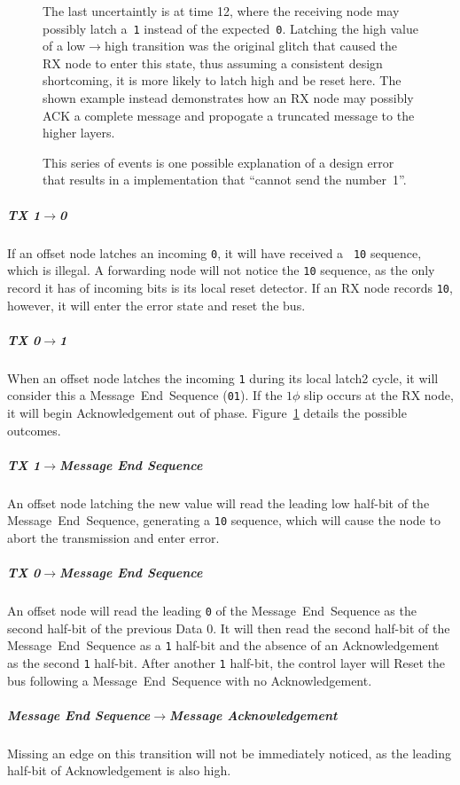 \begin{figure}[htb]
{    \hspace{1em}
    The last uncertaintly is at time 12, where the receiving node may possibly
    latch a~{\tt 1} instead of the expected~{\tt 0}. Latching the high value
    of a low$\rightarrow$high transition was the original glitch that caused
    the RX node to enter this state, thus assuming a consistent design
    shortcoming, it is more likely to latch high and be reset here. The shown
    example instead demonstrates how an RX node may possibly ACK a complete
    message and propogate a truncated message to the higher layers.

    \hspace{1em}
    This series of events is one possible explanation of a design error that
    results in a \bus implementation that ``cannot send the number~1''.
  }
  \label{fig:1phi-1-0}
\end{figure}

\subparagraph{TX 1$\rightarrow$0}
If an offset node latches an incoming {\tt 0}, it will have received a {\tt
10} sequence, which is illegal. A forwarding node will not notice the {\tt 10}
sequence, as the only record it has of incoming bits is its local reset
detector. If an RX node records {\tt 10}, however, it will enter the {\sc
error} state and reset the bus.

\subparagraph{TX 0$\rightarrow$1}
When an offset node latches the incoming {\tt 1} during its local {\sc latch2}
cycle, it will consider this a Message~End~Sequence ({\tt 01}). If the $1\phi$
slip occurs at the RX node, it will begin Acknowledgement out of phase.
Figure~\ref{fig:1phi-1-0} details the possible outcomes.

\subparagraph{TX 1$\rightarrow$Message End Sequence}
An offset node latching the new value will read the leading low half-bit of
the Message~End~Sequence, generating a {\tt 10} sequence, which will cause the
node to abort the transmission and enter {\sc error}.

\subparagraph{TX 0$\rightarrow$Message End Sequence}
An offset node will read the leading {\tt 0} of the Message~End~Sequence as
the second half-bit of the previous Data 0. It will then read the second
half-bit of the Message~End~Sequence as a {\tt 1} half-bit and the absence of
an Acknowledgement as the second {\tt 1} half-bit. After another {\tt 1}
half-bit, the control layer will Reset the bus following a
Message~End~Sequence with no Acknowledgement.

\subparagraph{Message End Sequence$\rightarrow$Message Acknowledgement}
Missing an edge on this transition will not be immediately noticed, as the
leading half-bit of Acknowledgement is also high.

